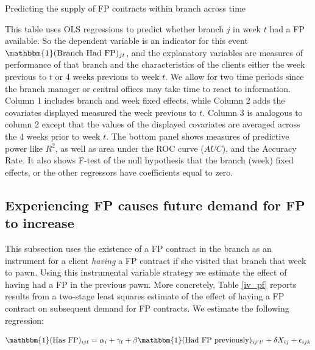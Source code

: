 \documentclass[oneside,11pt]{article}
\begin{document}
\begin{table}[H]
\caption{Predicting the supply of FP contracts within branch across time}
\label{instrument_random}
\begin{center}
\footnotesize{}
\end{center}
 \scriptsize
This table uses OLS regressions to predict whether branch $j$ in week $t$ had a FP available. So the dependent variable is an indicator for this event $\mathbbm{1}(\text{Branch Had FP})_{jt}$, and the explanatory variables are measures of performance of that branch and the characteristics of the clients either the week previous to $t$ or 4 weeks previous to week $t$. We allow for two time periods since the branch manager or central offices may take time to react to information. Column 1 includes branch and week fixed effects, while Column 2 adds the covariates displayed measured the week previous to $t$. Column 3 is analogous to column 2 except that the values of the displayed covariates are averaged across the 4 weeks prior to week $t$. The bottom panel shows measures of predictive power like $R^2$, as well as area under the ROC curve ($AUC$), and the Accuracy Rate. It also shows F-test of the null hypothesis that the branch (week) fixed effects, or the other regressors have coefficients equal to zero. 
\end{table}

\vspace{.1in}


\subsection{Experiencing FP causes future demand for FP to increase}

This subsection uses the existence of a FP contract in the branch as an instrument for a client \textit{having} a FP contract if she visited that branch that week to pawn. Using this instrumental variable strategy we estimate the effect of having had a FP in the previous pawn. More concretely, Table \ref{iv_pf} reports results from a two-stage least squares estimate of the effect of having a FP contract on subsequent demand for FP contracts. We estimate the following regression:

\begin{equation}
    \mathbbm{1}(\text{Has FP})_{ijt} = \alpha_i + \gamma_t + \beta \mathbbm{1}(\text{Had FP previously})_{ij't'} + \delta X_{ij} + \epsilon_{ijk}
    \label{eqn:IV}
\end{equation}
\vspace{.1in}
\end{document}
